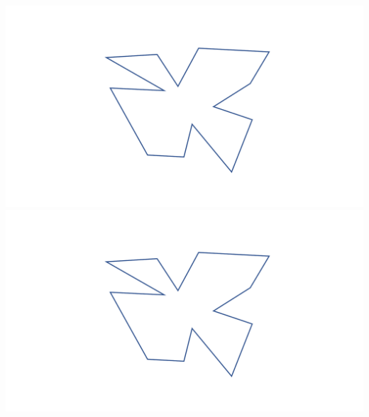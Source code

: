 \documentclass[a4paper,12pt]{article}
\begin{document}
\begin{center}
\vspace{25pt}
\includegraphics[width=0.375\linewidth]{../images/worksheet3_no_color.pdf}\hspace{50pt}
\includegraphics[width=0.375\linewidth]{../images/worksheet3_no_color.pdf}
\end{center}



\newpage
\end{document}
